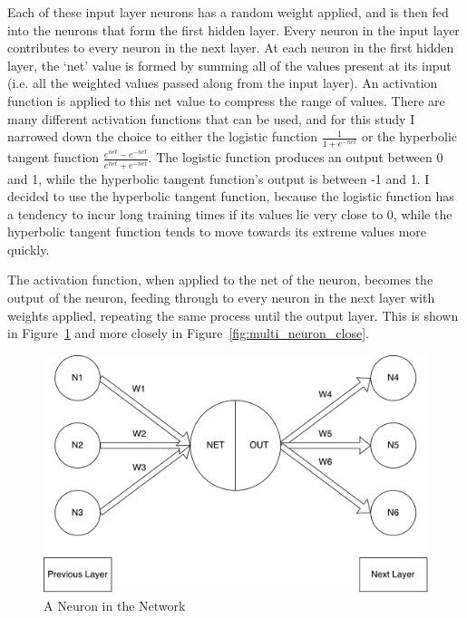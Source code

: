  Each of these input layer neurons has a random weight applied, and is then fed into the neurons that form the first hidden layer. Every neuron in the input layer contributes to every neuron in the next layer. At each neuron in the first hidden layer, the `net' value is formed by summing all of the values present at its input (i.e. all the weighted values passed along from the input layer). An activation function is applied to this net value to compress the range of values. There are many different activation functions that can be used, and for this study I narrowed down the choice to either the logistic function $ \frac{1}{1 + e^{-net}} $ or the hyperbolic tangent function $\frac{e^{net} - e^{-net}}{e^{net} + e^{-net}} $. The logistic function produces an output between 0 and 1, while the hyperbolic tangent function's output is between -1 and 1. I decided to use the hyperbolic tangent function, because the logistic function has a tendency to incur long training times if its values lie very close to 0, while the hyperbolic tangent function tends to move towards its extreme values more quickly.  
 
 The activation function, when applied to the net of the neuron, becomes the output of the neuron, feeding through to every neuron in the next layer with weights applied, repeating the same process until the output layer. This is shown in Figure~\ref{fig:multi_neuron} and more closely in Figure~\ref{fig:multi_neuron_close}.
 
 \begin{figure}[!h]
 	
 	\centering
 	\includegraphics[width=\textwidth]{figures/multilayer_perceptron_neuron}
 	\centering
 	\caption{A Neuron in the Network}
 	\label{fig:multi_neuron}
 \end{figure}

